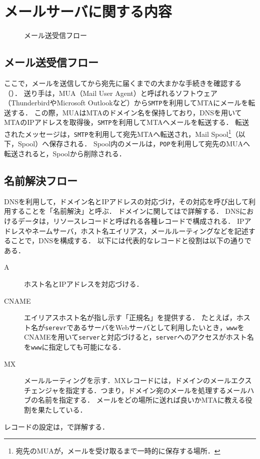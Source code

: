 \chapter{メールサーバに関する内容}
\begin{wrapfigure}{r}[0mm]{.43\textwidth}
    
    \caption{メール送受信フロー\footnotemark[2]}
    \label{fig:メール送受信フロー}
    \vspace{-1cm}
\end{wrapfigure}
\newcommand{\smtp}{\texttt{SMTP}}
\newcommand{\pop}{\texttt{POP}}
\newcommand{\imap}{\texttt{IMAP}}
\section{メール送受信フロー}
ここで，メールを送信してから宛先に届くまでの大まかな手続きを確認する（）．
送り手は，MUA（Mail User Agent）と呼ばれるソフトウェア（ThunderbirdやMicrosoft Outlookなど）から\smtp を利用してMTAにメールを転送する．
この際，MUAはMTAのドメイン名を保持しており，DNSを用いてMTAのIPアドレスを取得後，\smtp を利用してMTAへメールを転送する．
転送されたメッセージは，\smtp を利用して宛先MTAへ転送され，Mail Spool\footnote{宛先のMUAが，メールを受け取るまで一時的に保存する場所．}（以下，Spool）へ保存される．
Spool内のメールは，\pop を利用して宛先のMUAへ転送されると，Spoolから削除される．
\section{名前解決フロー}
DNSを利用して，ドメイン名とIPアドレスの対応づけ，その対応を呼び出して利用することを「名前解決」と呼ぶ．
ドメインに関してはで詳解する．
DNSにおけるデータは，リソースレコードと呼ばれる各種レコードで構成される．
IPアドレスやネームサーバ，ホスト名エイリアス，メールルーティングなどを記述することで，DNSを構成する\cite[p.88]{Postfix実用ガイド}．
以下には代表的なレコードと役割は以下の通りである．
\begin{oframed}
    \begin{description}
        \item[A] ホスト名とIPアドレスを対応づける．
        \item[CNAME] エイリアスホスト名が指し示す「正規名」を提供する．
            たとえば，ホスト名が\texttt{serevr}であるサーバをWebサーバとして利用したいとき，\texttt{www}をCNAMEを用いて\texttt{server}と対応づけると，\texttt{server}へのアクセスがホスト名を\texttt{www}に指定しても可能になる．
        \item[MX] メールルーティングを示す．MXレコードには，ドメインのメールエクスチェンジャを指定する．つまり，ドメイン宛のメールを処理するメールハブの名前を指定する．
            メールをどの場所に送れば良いかMTAに教える役割を果たしている．
    \end{description}
    \hfill\cite[p.88\ -\ p.89]{Postfix実用ガイド}
\end{oframed}
レコードの設定は，で詳解する．
\clearpage
\newcommand{\alias}{\texttt{alias}}
\newcommand{\user}{ユーザ}
